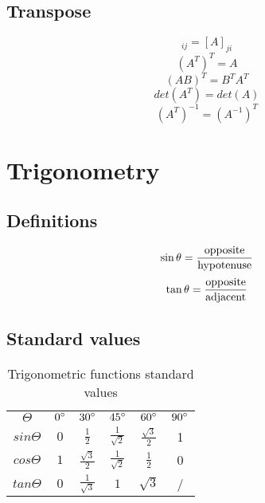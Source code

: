 \documentclass{article}
\begin{document}
		\subsection{Transpose}
			\begin{equation}
				[A^\mathrm{T}]_{ij} = [A]_{ji}
			\end{equation}
			\begin{equation}
				(A^T)^T = A
			\end{equation}
			\begin{equation}
				(AB)^T = B^TA^T %
			\end{equation}
			\begin{equation}
				det(A^T) = det(A)
			\end{equation}
			\begin{equation}
				(A^T)^{-1} = (A^{-1})^T
			\end{equation}
\section{Trigonometry}
	\subsection{Definitions}
		\begin{equation}
			\sin \theta = \frac{{{\rm{opposite}}}}{{{\rm{hypotenuse}}}}
		\end{equation}
		\begin{equation}
			\tan \theta = \frac{{{\rm{opposite}}}}{{{\rm{adjacent}}}}
		\end{equation}
	\subsection{Standard values}
	\bgroup
	\def\arraystretch{2}
		\begin{table}[hbp]
		\centering
		\begin{tabular}{cccccc}
			\hline
				$\Theta$	& $0\degree$ & $30\degree$ & $45\degree$ & $60\degree$ & $90\degree$ \\  
				$sin \Theta$	& $0$ & $\frac{1}{2}$ & $\frac{1}{\sqrt{2}}$ & $\frac{\sqrt{3}}{2}$ & 1	\\  
				$cos \Theta$	& $1$ & $\frac{\sqrt{3}}{2}$ & $\frac{1}{\sqrt{2}}$ & $\frac{1}{2}$	& 0 \\  
				$tan \Theta$	& $0$ & $\frac{1}{\sqrt{3}}$ & $1$ & $\sqrt{3}$	& / \\  
			\hline
		\end{tabular}
  		\caption{Trigonometric functions standard values}
  		\label{tab:standard-values}
		\end{table}
	\egroup
\end{document}
